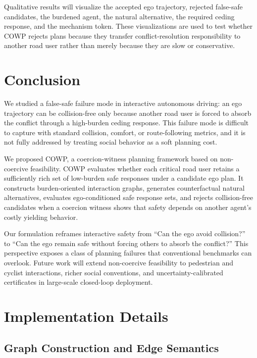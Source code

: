 \documentclass[10pt]{article}
\begin{document}
Qualitative results will visualize the accepted ego trajectory, rejected false-safe candidates, the burdened agent, the natural alternative, the required ceding response, and the mechanism token. These visualizations are used to test whether COWP rejects plans because they transfer conflict-resolution responsibility to another road user rather than merely because they are slow or conservative.

\section{Conclusion}
\label{sec:conclusion}

We studied a false-safe failure mode in interactive autonomous driving: an ego trajectory can be collision-free only because another road user is forced to absorb the conflict through a high-burden ceding response. This failure mode is difficult to capture with standard collision, comfort, or route-following metrics, and it is not fully addressed by treating social behavior as a soft planning cost.

We proposed COWP, a coercion-witness planning framework based on non-coercive feasibility. COWP evaluates whether each critical road user retains a sufficiently rich set of low-burden safe responses under a candidate ego plan. It constructs burden-oriented interaction graphs, generates counterfactual natural alternatives, evaluates ego-conditioned safe response sets, and rejects collision-free candidates when a coercion witness shows that safety depends on another agent's costly yielding behavior.

Our formulation reframes interactive safety from ``Can the ego avoid collision?'' to ``Can the ego remain safe without forcing others to absorb the conflict?'' This perspective exposes a class of planning failures that conventional benchmarks can overlook. Future work will extend non-coercive feasibility to pedestrian and cyclist interactions, richer social conventions, and uncertainty-calibrated certificates in large-scale closed-loop deployment.

\appendix

\section{Implementation Details}
\label{app:implementation_details}

\subsection{Graph Construction and Edge Semantics}
\label{app:graph_details}
\end{document}
